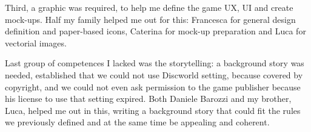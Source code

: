 		Third, a graphic was required, to help me define the game UX, UI and create mock-ups. Half my family helped me out for this: Francesca for general design definition and paper-based icons, Caterina for mock-up preparation and Luca for vectorial images.
		
		Last group of competences I lacked was the storytelling: a background story was needed, established that we could not use Discworld setting, because covered by copyright, and we could not even ask permission to the game publisher because his license to use that setting expired. Both Daniele Barozzi and my brother, Luca, helped me out in this, writing a background story that could fit the rules we previously defined and at the same time be appealing and coherent.